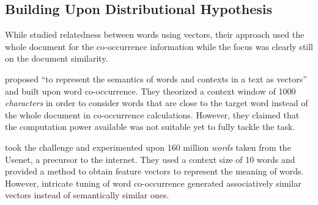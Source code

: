 \subsection{Building Upon Distributional Hypothesis}%
\label{sub:building_upon_distributional_hypothesis}

While \citeauthor{deerwester_indexing_1990} studied relatedness between words using vectors, their approach used the whole document for the co-occurrence information while the focus was clearly still on the document similarity.

\textcite{schutze_dimensions_1992} proposed \enquote{to represent the semantics of words and contexts in a text as vectors} and built upon word co-occurrence.
They theorized a context window of 1000 \emph{characters} in order to consider words that are close to the target word instead of the whole document in co-occurrence calculations.
However, they claimed that the computation power available was not suitable yet to fully tackle the task.

\textcite{lund_producing_1996} took the challenge and experimented upon 160 million \emph{words} taken from the Usenet, a precursor to the internet.
They used a context size of 10 words and provided a method to obtain feature vectors to represent the meaning of words.
However, intricate tuning of word co-occurrence generated associatively similar vectors instead of semantically similar ones.

